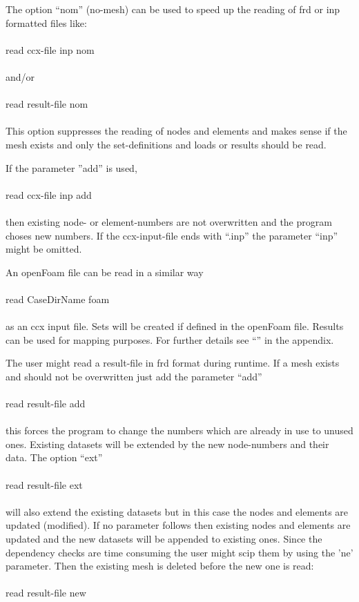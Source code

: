 \documentclass{article}
\begin{document}
The option ``nom'' (no-mesh) can be used to speed up the reading of frd or inp formatted files like:\\\\read ccx-file inp nom\\\\and/or\\\\read result-file nom\\\\This option suppresses the reading of nodes and elements and makes sense if the mesh exists and only the set-definitions and loads or results should be read. 

If the parameter ''add'' is used,\\\\read ccx-file inp add\\\\ then existing node- or element-numbers are not overwritten and the program choses new numbers. If the ccx-input-file ends with ``.inp'' the parameter ``inp'' might be omitted.

An openFoam file \cite{OpenFOAM} can be read in a similar way\\\\read CaseDirName foam\\\\as an ccx input file. Sets will be created if defined in the openFoam file. Results can be used for mapping purposes. For further details see ``'' in the appendix.

The user might read a result-file in frd format during runtime. If a mesh exists and should not be overwritten just add the parameter ``add''\\\\read result-file add\\\\this forces the program to change the numbers which are already in use to unused ones. Existing datasets will be extended by the new node-numbers and their data. The option ``ext'' \\\\read result-file ext\\\\will also extend the existing datasets but in this case the nodes and elements are updated (modified). If no parameter follows then existing nodes and elements are updated and the new datasets will be appended to existing ones. Since the dependency checks are time consuming the user might scip them by using the 'ne' parameter. Then the existing mesh is deleted before the new one is read:\\\\read result-file new\\\\
\end{document}
